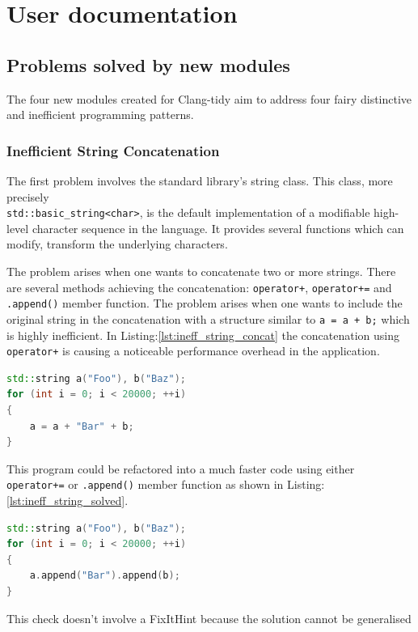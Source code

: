 \section{User documentation}
\subsection{Problems solved by new modules}
\par The four new modules created for Clang-tidy aim to address four fairy distinctive and inefficient programming patterns. 
\subsubsection{Inefficient String Concatenation\cite{clang_tidy_string_concat}}
\par The first problem involves the standard library's string class. This class, more precisely \\\verb|std::basic_string<char>|, is the default implementation of a modifiable high-level character sequence in the language. It provides several functions which can modify, transform the underlying characters. \medskip
\par The problem arises when one wants to concatenate two or more strings. There are several methods achieving the concatenation: \verb|operator+|, \verb|operator+=| and \verb|.append()| member function. The problem arises when one wants to include the original string in the concatenation with a structure similar to \verb|a = a + b;| which is highly inefficient. In Listing:\ref{lst:ineff_string_concat} the concatenation using \verb|operator+| is causing a noticeable performance overhead in the application.  \\
\begin{lstlisting}[language=c++, frame=single ,caption={Highly inefficient code}, label={lst:ineff_string_concat}]
std::string a("Foo"), b("Baz");
for (int i = 0; i < 20000; ++i) 
{
	a = a + "Bar" + b;
}
\end{lstlisting}
\par This program could be refactored into a much faster code using either \verb|operator+=| or \verb|.append()| member function as shown in Listing:\ref{lst:ineff_string_solved}.
 \begin{lstlisting}[language=c++, frame=single ,caption={A more efficient version}, label={lst:ineff_string_solved}]
std::string a("Foo"), b("Baz");
for (int i = 0; i < 20000; ++i) 
{
	a.append("Bar").append(b);
}
 \end{lstlisting}
 \par This check doesn't involve a FixItHint because the solution cannot be generalised 
